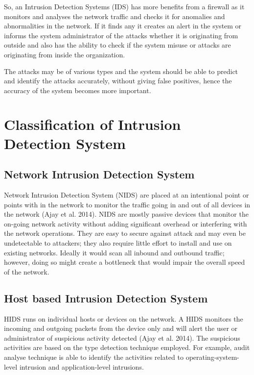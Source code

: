 \documentclass[12pt, a4paper]{report}
\begin{document}
So, an Intrusion Detection Systems (IDS) has more benefits from a firewall as it monitors and analyses the network traffic and checks it for anomalies and abnormalities in the network. If it finds any it creates an alert in the system or informs the system administrator of the attacks whether it is originating from outside and also has the ability to check if the system misuse or attacks are originating from inside the organization.\\ \par

The attacks may be of various types and the system should be able to predict and identify the attacks accurately, without giving false positives, hence the accuracy of the system becomes more important. \\ \par

\section{Classification of Intrusion Detection System}
\subsection{Network Intrusion Detection System}
Network Intrusion Detection System (NIDS) are placed at an intentional point or points with in the network to monitor the traffic going in and out of all devices in the network (Ajay et al. 2014). NIDS are mostly passive devices that monitor the on-going network activity without adding significant overhead or interfering with the network operations. They are easy to secure against attack and may even be undetectable to attackers; they also require little effort to install and use on existing networks. Ideally it would scan all inbound and outbound traffic; however, doing so might create a bottleneck that would impair the overall speed of the network.

\subsection{Host based Intrusion Detection System}
HIDS runs on individual hosts or devices on the network. A HIDS monitors the incoming and outgoing packets from the device only and will alert the user or administrator of suspicious activity detected (Ajay et al. 2014). The suspicious activities are based on the type detection technique employed. For example, audit analyse  technique is able to identify the activities related to operating-system-level intrusion and application-level intrusions.
\end{document}
